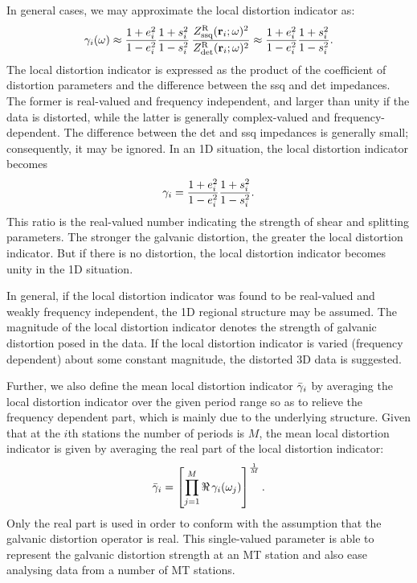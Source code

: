In general cases, we may approximate the local distortion indicator as:
\begin{equation}\label{eq:gamma_approx}
	\gammai\fxomega \approx \frac{1+\shearpi^2}{1-\shearpi^2} \frac{1+\splittingpi^2}{1-\splittingpi^2}\, \frac{\ZssqUndistorted\fxriomega^2}{\ZdetUndistorted\fxriomega^2} \approx \frac{1+\shearpi^2}{1-\shearpi^2} \frac{1+\splittingpi^2}{1-\splittingpi^2}.
\end{equation}
The local distortion indicator is expressed as the product of the coefficient of distortion parameters and the difference between the ssq and det impedances.
The former is real-valued and frequency independent, and larger than unity if the data is distorted, while the latter is generally complex-valued and frequency-dependent. The difference between the det and ssq impedances is generally small; consequently, it may be ignored.
In an 1D situation, the local distortion indicator becomes
\begin{equation}\label{eq:gamma_1d_analytic}
	\gammai = \frac{1+\shearpi^2}{1-\shearpi^2} \frac{1+\splittingpi^2}{1-\splittingpi^2}.
\end{equation}
This ratio is the real-valued number indicating the strength of shear and splitting parameters. The stronger the galvanic distortion, the greater the local distortion indicator.
But if there is no distortion, the local distortion indicator becomes unity in the 1D situation.

In general, if the local distortion indicator was found to be real-valued and weakly frequency independent, the 1D regional structure may be assumed. The magnitude of the local distortion indicator denotes the strength of galvanic distortion posed in the data. 
%
If the local distortion indicator is varied (frequency dependent) about some constant magnitude, the distorted 3D data is suggested. 

	Further, we also define the mean local distortion indicator $\bar{\gamma}_i$ by averaging the local distortion indicator over the given period range so as to relieve the frequency dependent part, which is mainly due to the underlying structure. 
%
Given that at the $i$th stations the number of periods is $M$, the mean local distortion indicator is given by averaging the real part of the local distortion indicator:
\begin{equation}\label{eq:gamma_local_mean_def}
	\gammaimean = \left[\prod\limits_{j=1}^{M} \Re\,\gammai(\omega_j) \right]^\frac{1}{M}.
\end{equation}
%
Only the real part is used in order to conform with the assumption that the galvanic distortion operator is real. 
This single-valued parameter is able to represent the galvanic distortion strength at an MT station and also ease analysing data from a number of MT stations. 

